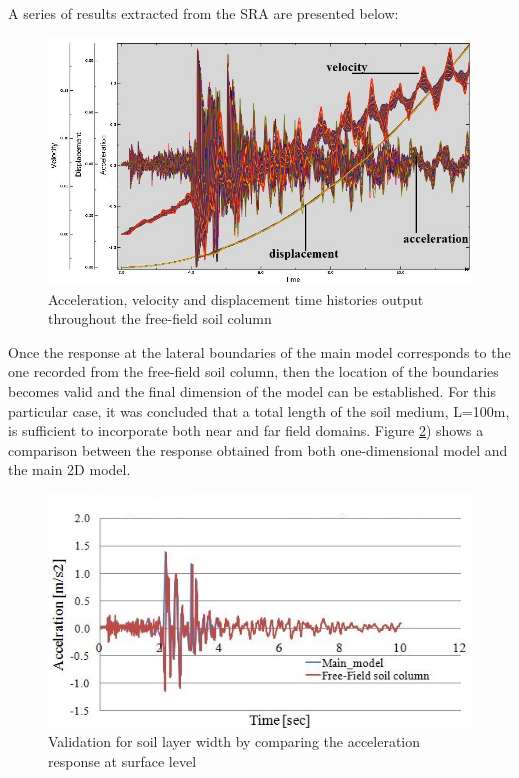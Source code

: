 	A series of results extracted from the SRA are presented below:
		\begin{figure}[h!]
			\centering
			\includegraphics[width=0.8\linewidth]{"response_model_v12_FBC"}
			\caption{Acceleration, velocity and displacement time histories output throughout the free-field soil column}
			\label{Acc_ff}
		\end{figure} 
		
	Once the response at the lateral boundaries of the main model corresponds to the one recorded from the free-field soil column, then the location of the boundaries becomes valid and the final dimension of the model can be established. For this particular case, it was concluded that a total length of the soil medium, L=100m, is sufficient to incorporate both near and far field domains. Figure \ref{validation}) shows a comparison between the response obtained from both one-dimensional model and the main 2D model.
		\begin{figure}[!h]
			\centering
			\includegraphics[width=0.7\linewidth]{"free-field2"}
			\caption{Validation for soil layer width by comparing the acceleration response at surface level}
			\label{validation}
		\end{figure}			
			
			
	\newpage
